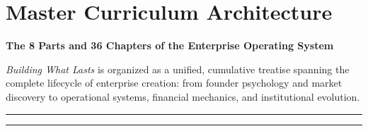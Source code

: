 \chapter*{Master Curriculum Architecture}

\noindent
\begin{minipage}{\linewidth}
  {\BayesDisplayFont\fontsize{13}{16}\selectfont\bfseries\color{BayesInk}
  The 8 Parts and 36 Chapters of the Enterprise Operating System
  \par}
  \vspace{3pt}
  {\small\color{BayesSecondary}
  \textit{Building What Lasts} is organized as a unified, cumulative treatise spanning the complete lifecycle of enterprise creation: from founder psychology and market discovery to operational systems, financial mechanics, and institutional evolution.
  \par}
  \vspace{4pt}
  {\color{BayesTeal}\rule{2.5cm}{1.2pt}}\textcolor{BayesBorder}{\rule{\dimexpr\linewidth-2.5cm\relax}{0.4pt}}\par
\end{minipage}
\vspace{4pt}

